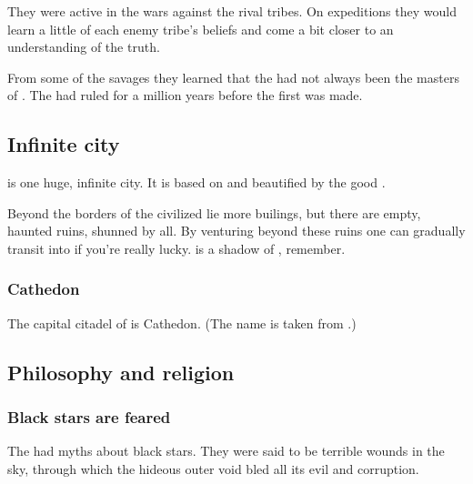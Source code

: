 They were active in the wars against the rival tribes. 
On expeditions they would learn a little of each enemy tribe's beliefs and come a bit closer to an understanding of the truth. 

From some of the savages they learned that the \resphain had not always been the masters of \Nyx. 
The  had ruled \Nyx for a million years before the first \resphan was made. 










\subsection{Infinite city}
\Merkyrah{} is one huge, infinite city. 
It is based on \Erebos{} and beautified by the good \resphain. 

Beyond the borders of the civilized \Merkyrah{} lie more builings, but there are empty, haunted ruins, shunned by all. 
By venturing beyond these ruins one can gradually transit into \Erebos\dash if you're really lucky. 
\Nyx{} is a shadow of \Erebos, remember. 





\subsubsection{Cathedon}
The capital citadel of \Merkyrah{} is Cathedon. 
(The name is taken from .) 











\subsection{Philosophy and religion}





\subsubsection{Black stars are feared}
The \Merkyrans{} had myths about black stars. 
They were said to be terrible wounds in the sky, through which the hideous outer void bled all its evil and corruption. 

